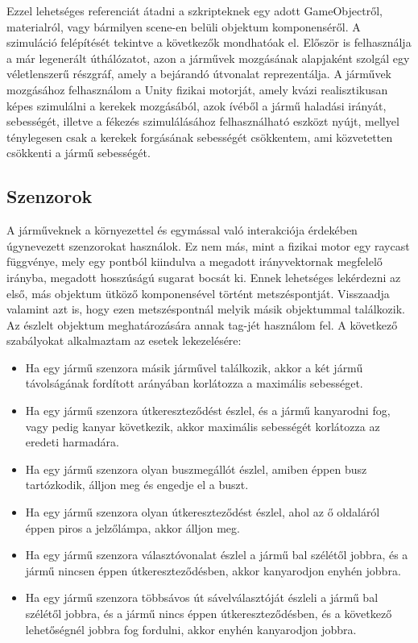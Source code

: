 Ezzel lehetséges referenciát átadni a szkripteknek egy adott GameObjectről, materialról, vagy bármilyen scene-en belüli objektum komponenséről.
A szimuláció felépítését tekintve a következők mondhatóak el. Először is felhasználja a már legenerált úthálózatot, azon a járművek mozgásának alapjaként szolgál egy véletlenszerű részgráf, amely a bejárandó útvonalat reprezentálja.
A járművek mozgásához felhasználom a Unity fizikai motorját, amely kvázi realisztikusan képes szimulálni a kerekek mozgásából, azok ívéből a jármű haladási irányát, sebességét, illetve a fékezés szimulálásához felhasználható eszközt nyújt, mellyel ténylegesen csak a kerekek forgásának sebességét csökkentem, ami közvetetten csökkenti a jármű sebességét.
\subsection{Szenzorok}
A járműveknek a környezettel és egymással való interakciója érdekében úgynevezett szenzorokat használok. Ez nem más, mint a fizikai motor egy raycast függvénye, mely egy pontból kiindulva a megadott irányvektornak megfelelő irányba, megadott hosszúságú sugarat bocsát ki. Ennek lehetséges lekérdezni az első, más objektum ütköző komponensével történt metszéspontját. Visszaadja valamint azt is, hogy ezen metszéspontnál melyik másik objektummal találkozik.
Az észlelt objektum meghatározására annak tag-jét használom fel.
A következő szabályokat alkalmaztam az esetek lekezelésére:
\begin{itemize}
\item{Ha egy jármű szenzora másik járművel találkozik, akkor a két jármű távolságának fordított arányában korlátozza a maximális sebességet.}
\item{Ha egy jármű szenzora útkereszteződést észlel, és a jármű kanyarodni fog, vagy pedig kanyar következik, akkor maximális sebességét korlátozza az eredeti harmadára.}
\item{Ha egy jármű szenzora olyan buszmegállót észlel, amiben éppen busz tartózkodik, álljon meg és engedje el a buszt.}
\item{Ha egy jármű szenzora olyan útkereszteződést észlel, ahol az ő oldaláról éppen piros a jelzőlámpa, akkor álljon meg.}
\item{Ha egy jármű szenzora választóvonalat észlel a jármű bal szélétől jobbra, és a jármű nincsen éppen útkereszteződésben, akkor kanyarodjon enyhén jobbra.}
\item{Ha egy jármű szenzora többsávos út sávelválasztóját észleli a jármű bal szélétől jobbra, és a jármű nincs éppen útkereszteződésben, és a következő lehetőségnél jobbra fog fordulni, akkor enyhén kanyarodjon jobbra.}
\end{itemize}
